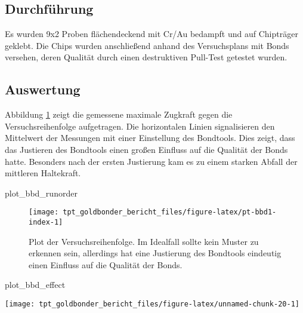 \documentclass[
  paper=a4,
  ,captions=tableheading
]{scrartcl}
\newenvironment{Shaded}{\begin{snugshade}}{\end{snugshade}}
\newcommand{\NormalTok}[1]{#1}
\begin{document}
\hypertarget{pt-bbd-methods}{%
\subsection{Durchführung}\label{pt-bbd-methods}}

Es wurden 9x2 Proben flächendeckend mit Cr/Au bedampft und auf Chipträger geklebt. Die Chips wurden anschließend anhand des Versuchsplans mit Bonds versehen, deren Qualität durch einen destruktiven Pull-Test getestet wurden.

\hypertarget{auswertung-2}{%
\subsection{Auswertung}\label{auswertung-2}}

Abbildung \ref{fig:pt-bbd1-index} zeigt die gemessene maximale Zugkraft gegen die Versuchsreihenfolge aufgetragen. Die horizontalen Linien signalisieren den Mittelwert der Messungen mit einer Einstellung des Bondtools. Dies zeigt, dass das Justieren des Bondtools einen großen Einfluss auf die Qualität der Bonds hatte. Besonders nach der ersten Justierung kam es zu einem starken Abfall der mittleren Haltekraft.

\begin{Shaded}
\begin{Highlighting}[]
\NormalTok{plot_bbd_runorder}
\end{Highlighting}
\end{Shaded}

\begin{figure}

{\centering \texttt{[image: tpt\_goldbonder\_bericht\_files/figure-latex/pt-bbd1-index-1]} 

}

\caption{Plot der Versuchsreihenfolge. Im Idealfall sollte kein Muster zu erkennen sein, allerdings hat eine Justierung des Bondtools eindeutig einen Einfluss auf die Qualität der Bonds.}\label{fig:pt-bbd1-index}
\end{figure}

\begin{Shaded}
\begin{Highlighting}[]
\NormalTok{plot_bbd_effect}
\end{Highlighting}
\end{Shaded}

\begin{center}\texttt{[image: tpt\_goldbonder\_bericht\_files/figure-latex/unnamed-chunk-20-1]} \end{center}
\end{document}
